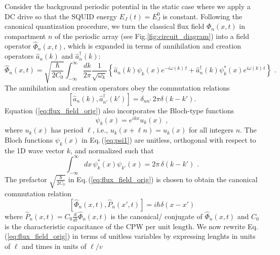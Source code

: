 Consider the background periodic potential in the static case where we apply a DC drive so that the SQUID energy $E_J(t) = E_J^0$ is constant. Following the canonical quantization procedure, we turn the classical flux field ${\Phi}_n(x,t)$ 
in compartment $n$ of the periodic array (see Fig.\ref{fig:circuit_diagram})
into a field operator $\hat{\Phi}_n(x,t)$, which is expanded in terms of 
annihilation and creation operators $ \hat{a}_n(k)$ and ${\hat a}_n^\dagger(k)$:
%
\begin{equation} \label{eq:flux_field_orig}
    \hat{\Phi}_n(x,t) = \sqrt{\frac{\hbar}{2 C_0}} 
    \int_{-\infty}^{\infty}\frac{dk}{2 \pi} \frac{1}{\sqrt{\omega_k}}
    \left\{ \hat{a}_n(k) \psi_k(x)e^{-i \omega(k) \, t} + 
    \hat{a}_n^{\dagger}(k) \psi_k^*(x) e^{i \omega(k) \, t} \right\} \, \, .
\end{equation}
%
The annihilation and creation operators obey the commutation relations
%
\begin{equation} \label{eq:cra_orig}
    \left[ \hat{a}_n(k),{\hat a}_{n'}^\dagger(k') \right] = \delta_{nn'} \, 2 \pi \delta(k - k').
\end{equation}
%
Equation (\ref{eq:flux_field_orig}) also incorporates the Bloch-type functions 
%
\begin{equation} \label{eq:psi1}
\psi_k(x) = e^{i k x} u_k(x) \, \, ,   
\end{equation}
%
where $u_k(x)$ has period $\ell$, i.e., $u_k(x + \ell n) = u_k(x)$ for all integers $n$.
The Bloch functions $\psi_k(x)$ in Eq.\,(\ref{eq:psi1}) are unitless, orthogonal with respect to 
the 1D wave vector $k$, and normalized such that
%
\begin{equation} \label{eq:psi1_norm_orig}
\int_{-\infty}^{\infty} dx \, \psi^*_k(x) \psi_{k'}(x) = 2 \pi \, \delta(k - k') \, \, .
\end{equation}
%
The prefactor $\displaystyle{\sqrt{\frac{\hbar}{2 C_0}}}$ in Eq.\,(\ref{eq:flux_field_orig}) is chosen 
to obtain the canonical commutation relation 
%
\begin{equation} \label{eq:commrelphi}
\left[ \hat{\Phi}_n(x,t), \hat{P}_n(x',t) \right] = i \hbar \delta(x-x')
\end{equation}
%
where $\hat{P}_n(x,t) = C_0 \displaystyle{\frac{d}{dt}} \hat{\Phi}_n(x,t)$ is the 
canonical/ conjugate of $\hat{\Phi}_n(x,t)$ and $C_0$ is the characteristic capacitance of the CPW per unit length. 
%
We now rewrite Eq.\,(\ref{eq:flux_field_orig}) in terms of unitless variables 
by expressing lenghts in units of $\ell$ and times in units of $\ell/v$
